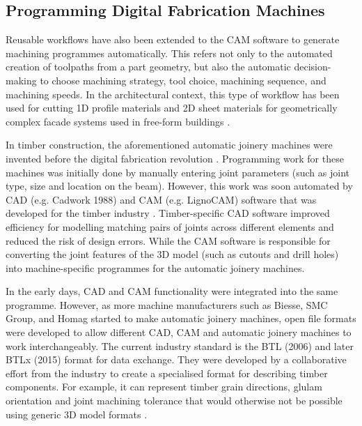 \subsection{Programming Digital Fabrication Machines}
\label{subsection:introduction-programming-digital-fabrication-machines}

Reusable workflows have also been extended to the CAM software to generate machining programmes automatically. This refers not only to the automated creation of toolpaths from a part geometry, but also the automatic decision-making to choose machining strategy, tool choice, machining sequence, and machining speeds. In the architectural context, this type of workflow has been used for cutting 1D profile materials and 2D sheet materials for geometrically complex facade systems used in free-form buildings \parencite{eigensatzPanelingArchitecturalFreeform2010, sheldenDigitalSurfaceRepresentation2002}.

In timber construction, the aforementioned automatic joinery machines were invented before the digital fabrication revolution \parencite{hanshundeggeragCorporateDevelopment2023}. Programming work for these machines was initially done by manually entering joint parameters (such as joint type, size and location on the beam). However, this work was soon automated by CAD (e.g. Cadwork 1988) and CAM (e.g. LignoCAM) software that was developed for the timber industry \parencite{schwinnManufacturingPerspectives2016}. Timber-specific CAD software improved efficiency for modelling matching pairs of joints across different elements and reduced the risk of design errors. While the CAM software is responsible for converting the joint features of the 3D model (such as cutouts and drill holes) into machine-specific programmes for the automatic joinery machines.

In the early days, CAD and CAM functionality were integrated into the same programme. However, as more machine manufacturers such as Biesse, SMC Group, and Homag started to make automatic joinery machines, open file formats were developed to allow different CAD, CAM and automatic joinery machines to work interchangeably. The current industry standard is the BTL (2006) and later BTLx (2015) format for data exchange. They were developed by a collaborative effort from the industry to create a specialised format for describing timber components. For example, it can represent timber grain directions, glulam orientation and joint machining tolerance that would otherwise not be possible using generic 3D model formats \parencite{lignocamBTLxWhatIt2020, design2machineHistoryDataTransfer2023}. 

